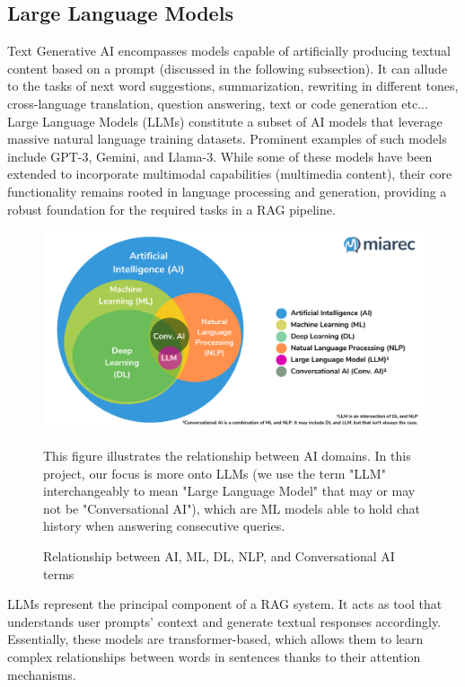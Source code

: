 \subsection{Large Language Models}
Text Generative AI encompasses models capable of artificially producing textual content based on a prompt (discussed in the following subsection). It can allude to the tasks of next word suggestions, summarization, rewriting in different tones, cross-language translation, question answering, text or code generation etc...
Large Language Models (LLMs) constitute a subset of AI models that leverage massive natural language training datasets. Prominent examples of such models include GPT-3, Gemini, and Llama-3. While some of these models have been extended to incorporate multimodal capabilities (multimedia content), their core functionality remains rooted in language processing and generation, providing a robust foundation for the required tasks in a RAG pipeline.
\begin{figure}[H]
    \centering
    \includegraphics[width=.97\linewidth]{./figures/genai-relation-diagram.png}
    \caption{Relationship between AI, ML, DL, NLP, and Conversational AI terms \cite{aidomainsrel}}
    \begin{flushleft}
        \small This figure illustrates the relationship between AI domains. In this project, our focus is more onto LLMs (we use the term "LLM" interchangeably to mean "Large Language Model" that may or may not be "Conversational AI"), which are ML models able to hold chat history when answering consecutive queries.
    \end{flushleft}
\end{figure}
LLMs represent the principal component of a RAG system. It acts as tool that understands user prompts' context and generate textual responses accordingly. Essentially, these models are transformer-based, which allows them to learn complex relationships between words in sentences thanks to their attention mechanisms.
